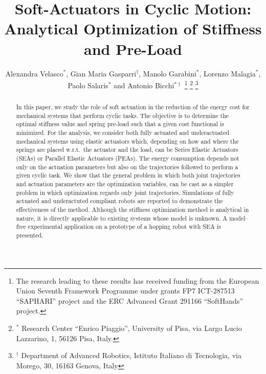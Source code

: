 \documentclass[letterpaper, 10 pt, conference]{ieeeconf}  %
\title{\LARGE \bf Soft-Actuators in Cyclic Motion: Analytical Optimization of Stiffness and Pre-Load 
}
\author{Alexandra Velasco$^*$, Gian Maria Gasparri$^\dagger$, Manolo Garabini$^*$, Lorenzo Malagia$^*$, \\Paolo Salaris$^*$ and Antonio Bicchi$^{*\dagger}$
\thanks{The research leading to these results has received funding from the European Union Seventh Framework Programme   under grants FP7 ICT-287513 ``SAPHARI'' project and the ERC Advanced Grant 291166 ``SoftHands'' project.}
\thanks{$^*$ Research Center ``Enrico Piaggio'', University of Pisa, via Largo Lucio Lazzarino, 1, 56126 Pisa, Italy.}
\thanks{$^\dagger$ Department of Advanced Robotics, Istituto Italiano di Tecnologia, via Morego, 30, 16163 Genova, Italy}
}
\begin{document}
\maketitle
\thispagestyle{empty}
\pagestyle{empty}


\begin{abstract}
In this paper, we study the role of soft actuation in the reduction of the energy cost for mechanical systems that perform cyclic tasks. The objective is to determine the optimal stiffness value and spring pre-load such that a given cost functional is minimized. For the analysis, we consider both fully actuated and underactuated mechanical systems using elastic actuators which, depending on how and where the springs are placed w.r.t.~the actuator and the load, can be Series Elastic Actuators (SEAs) or Parallel Elastic Actuators (PEAs). The energy consumption depends not only on the actuation parameters but also on the trajectories followed to perform a given cyclic task. We show that the general problem in which both joint trajectories and actuation parameters are the optimization variables, can be cast as a simpler problem in which optimization regards only joint trajectories. Simulations of fully actuated and underactuted compliant robots are reported to demonstrate the effectiveness of the method.
Although the stiffness optimization method is analytical in nature, it is directly applicable to existing systems whose model is unknown. A model--free experimental application on a prototype of a hopping robot with SEA is presented.
\end{abstract}











\end{document}
